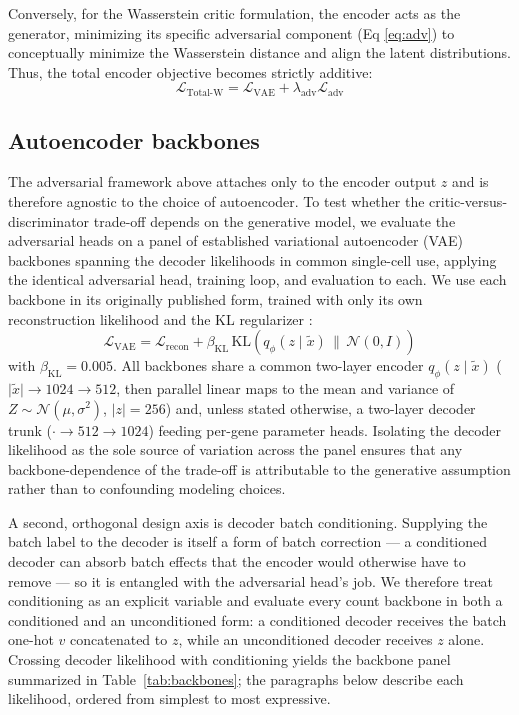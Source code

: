 \documentclass[unnumsec,webpdf,contemporary,large]{oup-authoring-template}%
\theoremstyle{thmstyleone}%
\theoremstyle{thmstyletwo}%
\theoremstyle{thmstylethree}%
\begin{document}
Conversely, for the Wasserstein critic formulation, the encoder acts as the generator, minimizing its specific adversarial component (Eq \ref{eq:adv}) to conceptually minimize the Wasserstein distance and align the latent distributions. Thus, the total encoder objective becomes strictly additive:
\begin{equation*}
    \mathcal{L}_{\text{Total-W}} = \mathcal{L}_{\text{VAE}} + \lambda_{\text{adv}} \mathcal{L}_{\text{adv}}
\end{equation*}

\subsection{Autoencoder backbones}\label{sec:backbones}
The adversarial framework above attaches only to the encoder output $z$ and is therefore agnostic to the choice of autoencoder. To test whether the critic-versus-discriminator trade-off depends on the generative model, we evaluate the adversarial heads on a panel of established variational autoencoder (VAE) backbones spanning the decoder likelihoods in common single-cell use, applying the identical adversarial head, training loop, and evaluation to each. We use each backbone in its originally published form, trained with only its own reconstruction likelihood and the KL regularizer \citep{Kingma2014}:
\begin{equation*}
    \mathcal{L}_{\text{VAE}} = \mathcal{L}_{\text{recon}} + \beta_{\text{KL}}\,\mathrm{KL}\!\left(q_\phi(z\mid\tilde{x})\,\|\,\mathcal{N}(0,I)\right)
\end{equation*}
with $\beta_{\text{KL}}=0.005$. All backbones share a common two-layer encoder $q_\phi(z\mid\tilde{x})$ ($\lvert\tilde{x}\rvert\!\rightarrow\!1024\!\rightarrow\!512$, then parallel linear maps to the mean and variance of $Z\sim\mathcal{N}(\mu,\sigma^2)$, $\lvert z\rvert=256$) and, unless stated otherwise, a two-layer decoder trunk ($\cdot\!\rightarrow\!512\!\rightarrow\!1024$) feeding per-gene parameter heads. Isolating the decoder likelihood as the sole source of variation across the panel ensures that any backbone-dependence of the trade-off is attributable to the generative assumption rather than to confounding modeling choices.

A second, orthogonal design axis is decoder batch conditioning. Supplying the batch label to the decoder is itself a form of batch correction --- a conditioned decoder can absorb batch effects that the encoder would otherwise have to remove --- so it is entangled with the adversarial head's job. We therefore treat conditioning as an explicit variable and evaluate every count backbone in both a conditioned and an unconditioned form: a conditioned decoder receives the batch one-hot $v$ concatenated to $z$, while an unconditioned decoder receives $z$ alone. Crossing decoder likelihood with conditioning yields the backbone panel summarized in Table~\ref{tab:backbones}; the paragraphs below describe each likelihood, ordered from simplest to most expressive.
\end{document}
